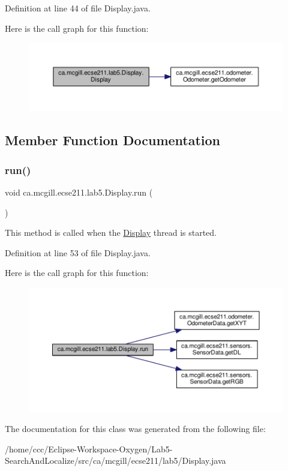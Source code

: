 Definition at line 44 of file Display.\+java.

Here is the call graph for this function\+:\nopagebreak
\begin{figure}[H]
\begin{center}
\leavevmode
\includegraphics[width=350pt]{classca_1_1mcgill_1_1ecse211_1_1lab5_1_1_display_abb1c01962b84cfad6ff897ce490b365a_cgraph}
\end{center}
\end{figure}


\subsection{Member Function Documentation}
\mbox{\label{classca_1_1mcgill_1_1ecse211_1_1lab5_1_1_display_a047e885f7170ba80f60fd3b4b2bc79a9}} 
\subsubsection{\texorpdfstring{run()}{run()}}
{\footnotesize\ttfamily void ca.\+mcgill.\+ecse211.\+lab5.\+Display.\+run (\begin{DoxyParamCaption}{ }\end{DoxyParamCaption})}

This method is called when the \hyperlink{classca_1_1mcgill_1_1ecse211_1_1lab5_1_1_display}{Display} thread is started. 

Definition at line 53 of file Display.\+java.

Here is the call graph for this function\+:\nopagebreak
\begin{figure}[H]
\begin{center}
\leavevmode
\includegraphics[width=350pt]{classca_1_1mcgill_1_1ecse211_1_1lab5_1_1_display_a047e885f7170ba80f60fd3b4b2bc79a9_cgraph}
\end{center}
\end{figure}


The documentation for this class was generated from the following file\+:\begin{DoxyCompactItemize}
\item 
/home/ccc/\+Eclipse-\/\+Workspace-\/\+Oxygen/\+Lab5-\/\+Search\+And\+Localize/src/ca/mcgill/ecse211/lab5/Display.\+java\end{DoxyCompactItemize}
